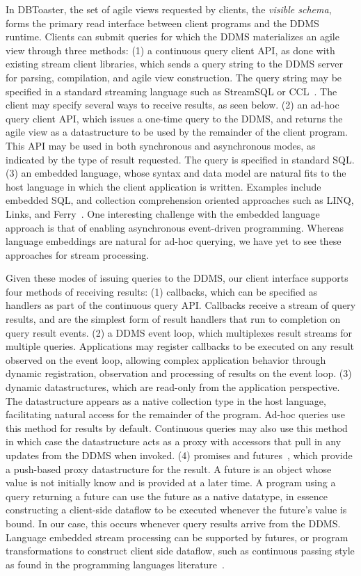 In DBToaster, the set of agile views requested by clients, the \textit{visible
schema}, forms the primary read interface between client programs and the DDMS
runtime. Clients can submit queries for which the DDMS materializes an agile
view through three methods:
(1) a continuous query client API, as done with existing stream client
libraries, which sends a query string to the DDMS server for parsing,
compilation, and agile view construction. The query string may be specified in a
standard streaming language such as StreamSQL or CCL~\cite{jain-pvldb:08}. The
client may specify several ways to receive results, as seen below.
(2) an ad-hoc query client API, which issues a one-time query to the
DDMS, and returns the agile view as a datastructure to be used by the remainder
of the client program. This API may be used in both synchronous and
asynchronous modes, as indicated by the type of result requested. The query is
specified in standard SQL.
(3) an embedded language, whose syntax and data model are natural fits to the
host language in which the client application is written. Examples include
embedded SQL, and collection comprehension oriented approaches such as LINQ,
Links, and Ferry~\cite{meijer-sigmod:06,cooper-fmco:06,grust-sigmod:09}.
One interesting challenge with the embedded language approach is that of
enabling asynchronous event-driven programming. Whereas language embeddings
are natural for ad-hoc querying, we have yet to see these approaches
for stream processing.

Given these modes of issuing queries to the DDMS, our client interface supports
four methods of receiving results:
(1) callbacks, which can be specified as handlers as part of the continuous query
API. Callbacks receive a stream of query results, and are the simplest form of
result handlers that run to completion on query result events.  
(2) a DDMS event loop, which multiplexes result streams for multiple queries.
Applications may register callbacks to be executed on any result observed on the
event loop, allowing complex application behavior through dynamic
registration, observation and processing of results on the event loop.
(3) dynamic datastructures, which are read-only from the application
perspective. The datastructure appears as a native collection type in the host
language, facilitating natural access for the remainder of the program. Ad-hoc
queries use this method for results by default. Continuous queries may also use
this method in which case the datastructure acts as a proxy with accessors that
pull in any updates from the DDMS when invoked.
(4) promises and futures~\cite{Liskov:1988:PLS:53990.54016}, which provide a
push-based proxy datastructure for the
result. A future is an object whose value is not initially know and is provided
at a later time. A program using a query returning a future can use the future
as a native datatype, in essence constructing a client-side dataflow to be
executed whenever the future's value is bound. In our case, this occurs whenever
query results arrive from the DDMS. Language embedded stream processing can be
supported by futures, or program transformations to construct client side
dataflow, such as continuous passing style as found in the programming languages
literature~\cite{sussman-hsc:98}.


